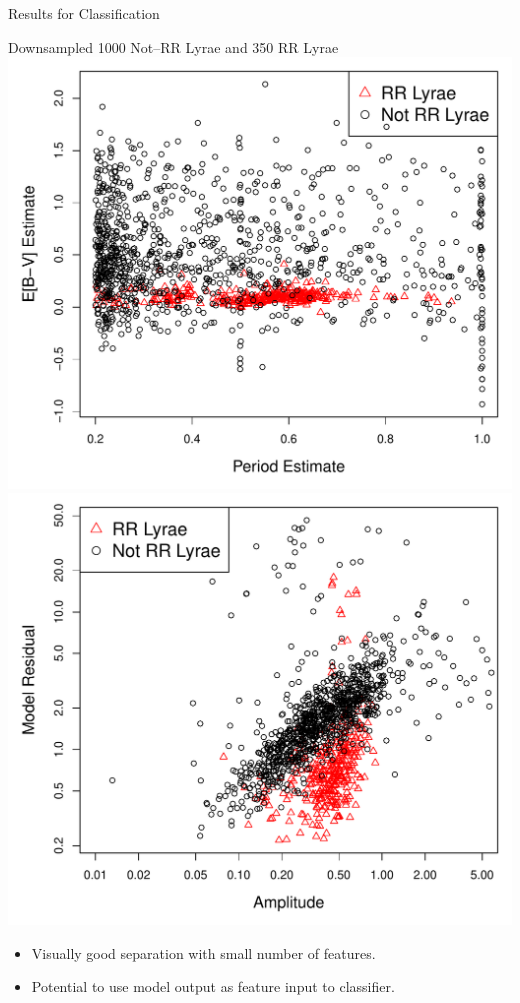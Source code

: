\documentclass[12pt]{beamer}
\begin{document}
\begin{frame}{Results for Classification}

\begin{center}
Downsampled 1000 Not--RR Lyrae and 350 RR Lyrae
\includegraphics[scale=.33]{figs/period_vs_EBV.pdf}
\includegraphics[scale=.33]{figs/a_vs_dev_log.pdf}
\end{center}

\begin{itemize}
\item Visually good separation with small number of features.
\item Potential to use model output as feature input to classifier.
\end{itemize}
\end{frame}
\end{document}
